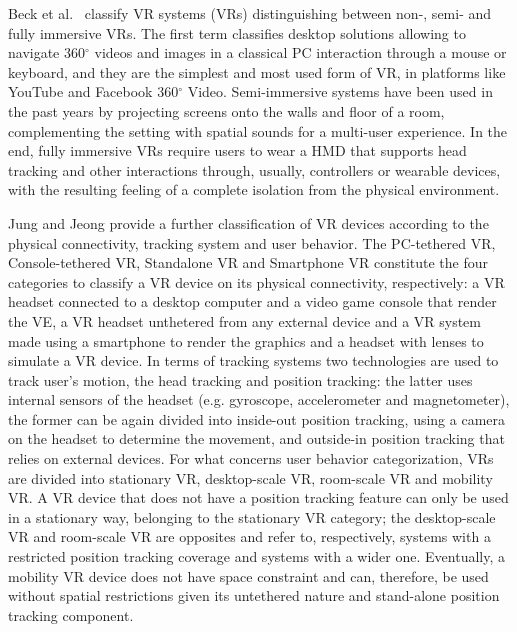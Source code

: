 Beck et al.~\cite{beck_virtual_2019} classify VR systems (VRs) distinguishing between non-, semi- and fully immersive VRs. The first term classifies desktop solutions allowing to navigate 360$^{\circ}$ videos and images in a classical PC interaction through a mouse or keyboard, and they are the simplest and most used form of VR, in platforms like YouTube and Facebook 360$^{\circ}$ Video. Semi-immersive systems have been used in the past years by projecting screens onto the walls and floor of a room, complementing the setting with spatial sounds for a multi-user experience.
In the end, fully immersive VRs require users to wear a \gls{HMD} that supports head tracking and other interactions through, usually, controllers or wearable devices, with the resulting feeling of a complete isolation from the physical environment.

Jung and Jeong \cite{jung_classification_2020} provide a further classification of VR devices according to the physical connectivity, tracking system and user behavior. The PC-tethered VR, Console-tethered VR, Standalone VR and Smartphone VR constitute the four categories to classify a VR device on its physical connectivity, respectively: a VR headset connected to a desktop computer and a video game console that render the VE, a VR headset unthetered from any external device and a VR system made using a smartphone to render the graphics and a headset with lenses to simulate a VR device. In terms of tracking systems two technologies are used to track user's motion, the head tracking and position tracking: the latter uses internal sensors of the headset (e.g. gyroscope, accelerometer and magnetometer), the former can be again divided into inside-out position tracking, using a camera on the headset to determine the movement, and outside-in position tracking that relies on external devices.
For what concerns user behavior categorization, VRs are divided into stationary VR, desktop-scale VR, room-scale VR and mobility VR. A VR device that does not have a position tracking feature can only be used in a stationary way, belonging to the stationary VR category; the desktop-scale VR and room-scale VR are opposites and refer to, respectively, systems with a restricted position tracking coverage and systems with a wider one. Eventually, a mobility VR device does not have space constraint and can, therefore, be used without spatial restrictions given its untethered nature and stand-alone position tracking component.